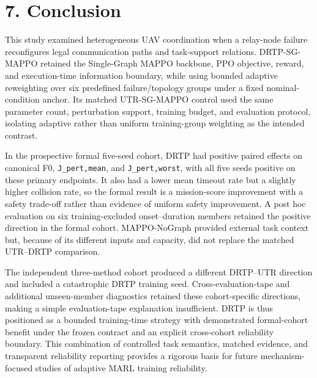 \section{7. Conclusion}

This study examined heterogeneous UAV coordination when a relay-node failure reconfigures legal communication paths and task-support relations. DRTP-SG-MAPPO retained the Single-Graph MAPPO backbone, PPO objective, reward, and execution-time information boundary, while using bounded adaptive reweighting over six predefined failure/topology groups under a fixed nominal-condition anchor. Its matched UTR-SG-MAPPO control used the same parameter count, perturbation support, training budget, and evaluation protocol, isolating adaptive rather than uniform training-group weighting as the intended contrast.

In the prospective formal five-seed cohort, DRTP had positive paired effects on canonical F0, \texttt{J_pert,mean}, and \texttt{J_pert,worst}, with all five seeds positive on these primary endpoints. It also had a lower mean timeout rate but a slightly higher collision rate, so the formal result is a mission-score improvement with a safety trade-off rather than evidence of uniform safety improvement. A post hoc evaluation on six training-excluded onset--duration members retained the positive direction in the formal cohort. MAPPO-NoGraph provided external task context but, because of its different inputs and capacity, did not replace the matched UTR--DRTP comparison.

The independent three-method cohort produced a different DRTP--UTR direction and included a catastrophic DRTP training seed. Cross-evaluation-tape and additional unseen-member diagnostics retained these cohort-specific directions, making a simple evaluation-tape explanation insufficient. DRTP is thus positioned as a bounded training-time strategy with demonstrated formal-cohort benefit under the frozen contract and an explicit cross-cohort reliability boundary. This combination of controlled task semantics, matched evidence, and transparent reliability reporting provides a rigorous basis for future mechanism-focused studies of adaptive MARL training reliability.